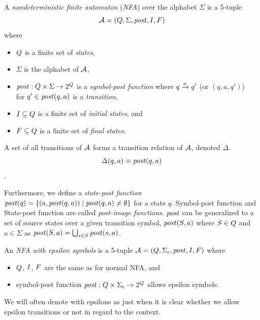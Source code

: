
\begin{definition} \hfill \newline
A \emph{nondeterministic finite automaton} (\emph{NFA}) over the alphabet $\Sigma$ is a 5-tuple $$\mathcal{A} = (Q, \Sigma, \mathit{post}, I, F)$$ where
\begin{itemize}
    \item $Q$ is a finite set of \emph{states},
    \item $\Sigma$ is the alphabet of $\mathcal{A}$,
    \item $\mathit{post}: Q \times \Sigma \rightarrow 2^{Q}$ is a \emph{symbol-post function} where ${q} \xrightarrow{{a}} {q'}$ (or $(q, a, q')$)\\for $q' \in \mathit{post}(q, a)$ is a \emph{transition},
    \item $I \subseteq Q$ is a finite set of \emph{initial states}, and
    \item $F \subseteq Q$ is a finite set of \emph{final states}.
\end{itemize}
\end{definition}

A set of all transitions of $\mathcal{A}$ forms a transition relation of $\mathcal{A}$, denoted $\Delta$.$$\Delta(q, a) \equiv \mathit{post}(q, a)$$.

Furthermore, we define a \emph{state-post function} $\mathit{post}(q) = \{ (a, \mathit{post}(q, a)) \mid \mathit{post}(q, a) \neq \emptyset \}$ for a state $q$.
Symbol-post function and State-post function are called \emph{post-image functions}.
$\mathit{post}$ can be generalized to a set of source states over a given transition symbol, $\mathit{post}(S, a)$ where $S \in Q$ and $a \in \Sigma$ as $\mathit{post}(S, a) = \bigcup_{s \in S} \mathit{post}(s, a)$.


\begin{definition} \hfill \newline
An \emph{NFA with epsilon symbols} is a 5-tuple $\mathcal{A} = (Q, \Sigma_\epsilon, \mathit{post}, I, F)$ where
\begin{itemize}
    \item $Q$, $I$, $F$ are the same as for normal NFA, and
    \item symbol-post function $\mathit{post}: Q \times \Sigma_\epsilon \rightarrow 2^{Q}$ allows epsilon symbols.
\end{itemize}
We will often denote \nfa with epsilons as just \nfa when it is clear whether we allow epsilon transitions or not in regard to the context.
\end{definition}

